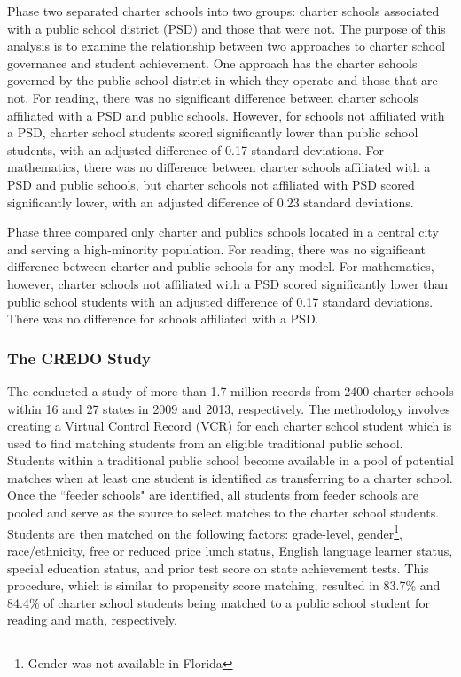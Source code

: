 \documentclass[letterpaper,12p,twoside]{article} %
\begin{document}
Phase two separated charter schools into two groups: charter schools associated with a public school district (PSD) and those that were not. The purpose of this analysis is to examine the relationship between two approaches to charter school governance and student achievement. One approach has the charter schools governed by the public school district in which they operate and those that are not. For reading, there was no significant difference between charter schools affiliated with a PSD and public schools. However, for schools not affiliated with a PSD, charter school students scored significantly lower than public school students, with an adjusted difference of 0.17 standard deviations. For mathematics, there was no difference between charter schools affiliated with a PSD and public schools, but charter schools not affiliated with PSD scored significantly lower, with an adjusted difference of 0.23 standard deviations.

Phase three compared only charter and publics schools located in a central city and serving a high-minority population. For reading, there was no significant difference between charter and public schools for any model. For mathematics, however, charter schools not affiliated with a PSD scored significantly lower than public school students with an adjusted difference of 0.17 standard deviations. There was no difference for schools affiliated with a PSD. 


\subsubsection{The CREDO Study}

The  conducted a study of more than 1.7 million records from 2400 charter schools within 16 and 27 states in 2009 and 2013, respectively. The methodology involves creating a Virtual Control Record (VCR) for each charter school student \cite<see also,>{AbadieDiamondHainueller2007,nea} which is used to find matching students from an eligible traditional public school. Students within a traditional public school become available in a pool of potential matches when at least one student is identified as transferring to a charter school. Once the ``feeder schools" are identified, all students from feeder schools are pooled and serve as the source to select matches to the charter school students. Students are then matched on the following factors: grade-level, gender\footnote{Gender was not available in Florida}, race/ethnicity, free or reduced price lunch status, English language learner status, special education status, and prior test score on state achievement tests. This procedure, which is similar to propensity score matching, resulted in 83.7\% and 84.4\% of charter school students being matched to a public school student for reading and math, respectively.
\end{document}
